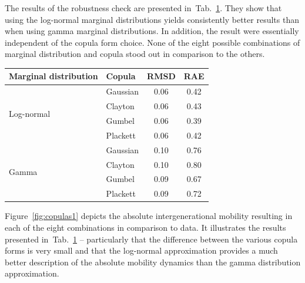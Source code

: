 \documentclass[12pt,a4paper]{article}
\newcommand{\ra}[1]{\renewcommand{\arraystretch}{#1}}
\newcommand{\Fref}[1]{Figure~\ref{fig:#1}}
\newcommand{\tlabel}[1]{\label{tab:#1}}
\newcommand{\tref}[1]{Tab.~\ref{tab:#1}}
\numberwithin{equation}{section}
\begin{document}
The results of the robustness check are presented in~\tref{robust}. They show that using the log-normal marginal distributions yields consistently better results than when using gamma marginal distributions. In addition, the result were essentially independent of the copula form choice. None of the eight possible combinations of marginal distribution and copula stood out in comparison to the others.

\begin{table}[!htb]
\ra{1.1}
\centering
{}\tlabel{robust}
\begin{tabular}{@{}llcc@{}}\toprule[1.5pt]
Marginal distribution & Copula & RMSD & RAE\\
\midrule[1.5pt]
\multirow{ 4}{*}{Log-normal}
& Gaussian & 0.06 & 0.42\\
& Clayton & 0.06 & 0.43\\
& Gumbel &  0.06 & 0.39\\
& Plackett & 0.06 & 0.42\\
\midrule[1.5pt]
\multirow{ 4}{*}{Gamma}
& Gaussian  & 0.10 & 0.76\\
& Clayton  & 0.10 & 0.80\\
& Gumbel  & 0.09 & 0.67\\
& Plackett & 0.09 & 0.72\\
\bottomrule[1.5pt]
\end{tabular}
\end{table}

\Fref{copulas1} depicts the absolute intergenerational mobility resulting in each of the eight combinations in comparison to data. It illustrates the results presented in~\tref{robust} -- particularly that the difference between the various copula forms is very small and that the log-normal approximation provides a much better description of the absolute mobility dynamics than the gamma distribution approximation.
\end{document}
